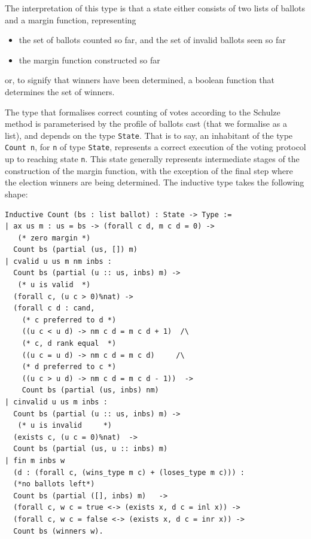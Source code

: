 \noindent
The interpretation of this type is that a state either consists of
two lists of ballots and a margin function, representing

\begin{itemize}
  \item the set of ballots counted so far, and the set of invalid
ballots seen so far
  \item the margin function constructed so far
\end{itemize}
or, to signify that winners have been determined, a boolean function
that determines the set of winners.

The type that formalises correct counting of votes according to the
Schulze method is parameterised by the profile of ballots cast (that
we formalise as a list), and depends on the type \texttt{State}. That
is to say, an inhabitant of the type \texttt{Count n}, for
\texttt{n} of type \texttt{State}, represents a correct execution of
the voting protocol up to reaching state \texttt{n}. This
state generally represents intermediate stages of the construction
of the margin function, with the exception of the final step where
the election winners are being determined. The inductive type takes
the following shape:

\begin{verbatim}
Inductive Count (bs : list ballot) : State -> Type :=
| ax us m : us = bs -> (forall c d, m c d = 0) -> 
   (* zero margin *)
  Count bs (partial (us, []) m) 
| cvalid u us m nm inbs : 
  Count bs (partial (u :: us, inbs) m) -> 
   (* u is valid  *)
  (forall c, (u c > 0)%nat) ->         
  (forall c d : cand, 
    (* c preferred to d *)
    ((u c < u d) -> nm c d = m c d + 1)  /\
    (* c, d rank equal  *)
    ((u c = u d) -> nm c d = m c d)     /\
    (* d preferred to c *)
    ((u c > u d) -> nm c d = m c d - 1))  ->
    Count bs (partial (us, inbs) nm)
| cinvalid u us m inbs : 
  Count bs (partial (u :: us, inbs) m) ->
   (* u is invalid     *)  
  (exists c, (u c = 0)%nat)  ->
  Count bs (partial (us, u :: inbs) m)
| fin m inbs w 
  (d : (forall c, (wins_type m c) + (loses_type m c))) :
  (*no ballots left*)
  Count bs (partial ([], inbs) m)   ->
  (forall c, w c = true <-> (exists x, d c = inl x)) ->
  (forall c, w c = false <-> (exists x, d c = inr x)) ->
  Count bs (winners w).
 
\end{verbatim}

